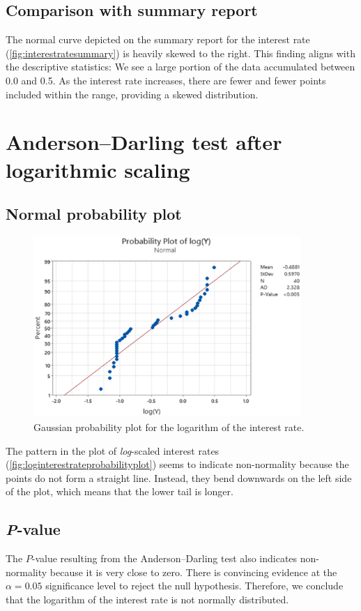 \documentclass[12pt]{article}
\begin{document}
\subsection{Comparison with summary report}
The normal curve depicted on the summary report for the interest rate (\autoref{fig:interestratesummary}) is heavily skewed to the right. This finding aligns with the descriptive statistics: We see a large portion of the data accumulated between 0.0 and 0.5. As the interest rate increases, there are fewer and fewer points included within the range, providing a skewed distribution.
\section{Anderson--Darling test after logarithmic scaling}
\subsection{Normal probability plot}
\begin{figure}[h]
\begin{center}
\includegraphics[width=4in]{images/log-interest-rate-probability-plot.png}
\end{center}
\caption{Gaussian probability plot for the logarithm of the interest rate. \label{fig:loginterestrateprobabilityplot}}
\end{figure}
The pattern in the plot of \textit{log}-scaled interest rates (\autoref{fig:loginterestrateprobabilityplot}) seems to indicate non-normality because the points do not form a straight line. Instead, they bend downwards on the left side of the plot, which means that the lower tail is longer.
\subsection{\textit{P}-value}
The $P$-value resulting from the Anderson--Darling test also indicates non-normality because it is very close to zero. There is convincing evidence at the $\alpha=0.05$ significance level to reject the null hypothesis. Therefore, we conclude that the logarithm of the interest rate is not normally distributed.
\end{document}
